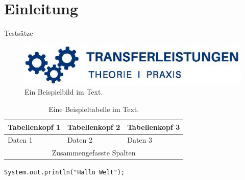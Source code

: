 \section{Einleitung}
Testsätze 
\cite{Dum:Bei}

\begin{figure}[h]
    \centering
    \includegraphics[width=\textwidth]{image/transferleistung.jpg}
    \caption{Ein Beispielbild im Text.}
    \label{fig:tl-logo}
\end{figure}

\begin{table}[h]
    \centering
    \begin{tabular}{|p{}|p{}|p{}|}
        \hline
        Tabellenkopf 1 & Tabellenkopf 2 & Tabellenkopf 3 \\\hline\hline
        Daten 1 & Daten 2 & Daten 3 \\\hline
        \multicolumn{3}{|c|}{Zusammengefasste Spalten} \\\hline
    \end{tabular}
    \caption{Eine Beispieltabelle im Text.}
    \label{tab:example}
\end{table}

\begin{lstlisting}[caption=Ausgabe Hallo Welt, label=sysout, captionpos=b]
    System.out.println("Hallo Welt");
\end{lstlisting}
